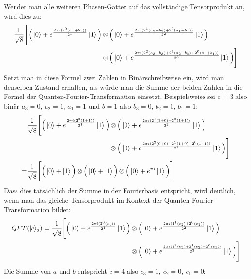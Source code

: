 Wendet man alle weiteren Phasen-Gatter auf das vollständige Tensorprodukt an, 
wird dies zu:
\begin{align*}
    \frac{1}{\sqrt{8}} 
    \Bigg[ 
      \Big(\ket{0} + { e^{\frac{2 \pi i (2^0(a_1+b_1))}{2^1}}}\ket{1} \Big) 
      &\operatorname{\otimes}
      \Big( \ket{0} + { e^{\frac{2 \pi i (2^1(a_2+b_2)+2^0(a_1+b_1))}{2^2}}}\ket{1} \Big)\\ 
      &\operatorname{\otimes}
      \Big( \ket{0} + { e^{\frac{2 \pi i (2^{2}(a_3+b_3) +2^1(a_2+b_2)+2^0(a_1+b_1))}{2^3}}}\ket{1} \Big) 
    \Bigg]
\end{align*}
Setzt man in diese Formel zwei Zahlen in Binärschreibweise ein, 
wird man denselben Zustand erhalten,
als würde man die Summe der beiden Zahlen in die Formel der Quanten-Fourier-Transformation einsetzt.
Beispielsweise sei \(a = 3\) also binär \(a_3 = 0\), \(a_2 = 1\), \(a_1 = 1\) und 
\(b = 1\) also \(b_3 = 0\), \(b_2 = 0\), \(b_1 = 1\):
\begin{align*}
&\begin{aligned}\frac{1}{\sqrt{8}} 
\Bigg[ \Big(\ket{0} + { e^{\frac{2 \pi i (2^0(1+1))}{2^1}}}\ket{1} \Big) 
&\operatorname{\otimes}
\Big( \ket{0} +  e^{\frac{2 \pi i (2^1(1+0)+2^0(1+1))}{2^2}}\ket{1} \Big) \\
&\operatorname{\otimes}
\Big( \ket{0} +  e^{\frac{2 \pi i (2^{2}(0+0) +2^1(1+0)+2^0(1+1))}{2^3}}\ket{1} \Big) 
\Bigg]
\end{aligned}\\
=&\frac{1}{\sqrt{8}} 
\Bigg[ \Big(\ket{0} + \ket{1} \Big) \operatorname{\otimes}
\Big( \ket{0} +   \ket{1} \Big) \operatorname{\otimes}
\Big( \ket{0} +  e^{\pi i }\ket{1} \Big) 
\Bigg]
\end{align*}
Dass dies tatsächlich der Summe in der Fourierbasis entspricht, wird deutlich, 
wenn man das gleiche Tensorprodukt im Kontext der Quanten-Fourier-Transformation bildet:
\begin{align*}
    QFT(\ket{c}_3) = 
    \frac{1}{\sqrt{8}} 
    \Bigg[ \Big(\ket{0} + { e^{\frac{2 \pi i (2^0(c_1))}{2^1}}}\ket{1} \Big) 
    &\operatorname{\otimes}
    \Big( \ket{0} + e^{\frac{2 \pi i (2^1(c_2)+2^0(c_1))}{2^2}}\ket{1} \Big) \\
    &\operatorname{\otimes}
    \Big( \ket{0} + { e^{\frac{2 \pi i (2^{2}(c_3) +2^1(c_2)+2^0(c_1))}{2^3}}}\ket{1} \Big) 
\Bigg]
\end{align*}
Die Summe von \(a\) und \(b\) entspricht \(c = 4\) also \(c_3 = 1,~c_2 = 0,~c_1=0\):
